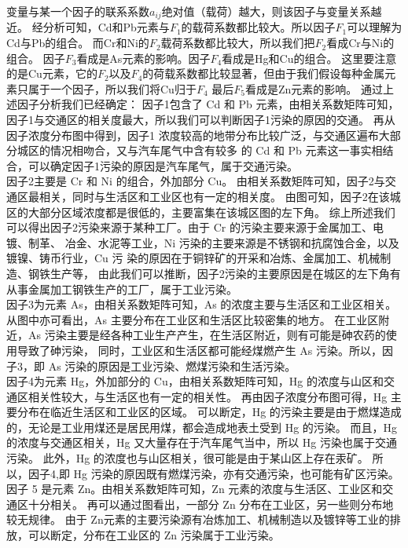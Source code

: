 \documentclass[a4paper]{article}
\begin{document}
变量与某一个因子的联系系数$a_{ij}$绝对值（载荷）越大，则该因子与变量关系越近。
经分析可知，Cd和Pb元素与$F_1$的载荷系数都比较大。所以因子$F_1$可以理解为Cd与Pb的组合。
而Cr和Ni的$F_2$载荷系数都比较大，所以我们把$F_2$看成Cr与Ni的组合。
因子$F_3$看成是As元素的影响。因子$F_4$看成是Hg和Cu的组合。
这里要注意的是Cu元素，它的$F_2$以及$F_4$的荷载系数都比较显著，但由于我们假设每种金属元素只属于一个因子，所以我们将Cu归于$F_4$
最后$F_5$看成是Zn元素的影响。
通过上述因子分析我们已经确定：
\indent 因子1包含了 Cd 和 Pb 元素，由相关系数矩阵可知，因子1与交通区的相关度最大，所以我们可以判断因子1污染的原因的交通。
再从因子浓度分布图中得到，因子1 浓度较高的地带分布比较广泛，与交通区遍布大部分城区的情况相吻合，又与汽车尾气中含有较多
的 Cd 和 Pb 元素这一事实相结合，可以确定因子1污染的原因是汽车尾气，属于交通污染。  \\
\indent 因子2主要是 Cr 和 Ni 的组合，外加部分 Cu。 
由相关系数矩阵可知，因子2与交通区最相关，同时与生活区和工业区也有一定的相关度。 
由图可知，因子2在该城区的大部分区域浓度都是很低的，主要富集在该城区图的左下角。
综上所述我们可以得出因子2污染来源于某种工厂。由于 Cr 的污染主要来源于金属加工、电镀、制革、
冶金、水泥等工业，Ni 污染的主要来源是不锈钢和抗腐蚀合金，以及镀镍、铸币行业，Cu 污
染的原因在于铜锌矿的开采和冶炼、金属加工、机械制造、钢铁生产等，
由此我们可以推断，因子2污染的主要原因是在城区的左下角有从事金属加工钢铁生产的工厂，属于工业污染。 \\
\indent 因子3为元素 As，由相关系数矩阵可知，As 的浓度主要与生活区和工业区相关。
从图中亦可看出，As 主要分布在工业区和生活区比较密集的地方。
在工业区附近，As 污染主要是经各种工业生产产生，在生活区附近，则有可能是砷农药的使用导致了砷污染，
同时，工业区和生活区都可能经煤燃产生 As 污染。所以，因子3，即 As 污染的原因是工业污染、燃煤污染和生活污染。    \\
\indent 因子4为元素 Hg，外加部分的 Cu，由相关系数矩阵可知，Hg 的浓度与山区和交通区相关性较大，与生活区也有一定的相关性。
再由因子浓度分布图可得，Hg 主要分布在临近生活区和工业区的区域。
可以断定，Hg 的污染主要是由于燃煤造成的，无论是工业用煤还是居民用煤，都会造成地表土受到 Hg 的污染。
而且，Hg 的浓度与交通区相关，Hg 又大量存在于汽车尾气当中，所以 Hg 污染也属于交通污染。
此外，Hg 的浓度也与山区相关，很可能是由于某山区上存在汞矿。
所以，因子4,即 Hg 污染的原因既有燃煤污染，亦有交通污染，也可能有矿区污染。    \\
\indent 因子 5 是元素 Zn。由相关系数矩阵可知，Zn 元素的浓度与生活区、工业区和交通区十分相关。
再可以通过图看出，一部分 Zn 分布在工业区，另一些则分布地较无规律。
由于 Zn元素的主要污染源有冶炼加工、机械制造以及镀锌等工业的排放，可以断定，分布在工业区的 Zn 污染属于工业污染。
\end{document}
